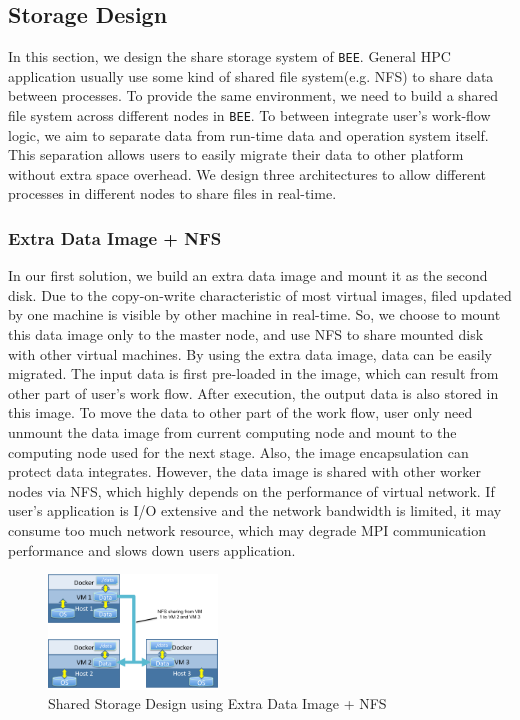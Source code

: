 \subsection{Storage Design}
In this section, we design the share storage system of \texttt{BEE}. General HPC application usually use some kind of shared file system(e.g. NFS) to share data between processes. To provide the same environment, we need to build a shared file system across different nodes in \texttt{BEE}. To between integrate user's work-flow logic, we aim to separate data from run-time data and operation system itself. This separation allows users to easily migrate their data to other platform without extra space overhead. We design three architectures to allow different processes in different nodes to share files in real-time.

\subsubsection{Extra Data Image + NFS}
In our first solution, we build an extra data image and mount it as the second disk. Due to the copy-on-write characteristic of most virtual images, filed updated by one machine is visible by other machine in real-time. So, we choose to mount this data image only to the master node, and use NFS to share mounted disk with other virtual machines. By using the extra data image, data can be easily migrated. The input data is first pre-loaded in the image, which can result from other part of user's work flow. After execution, the output data is also stored in this image. To move the data to other part of the work flow, user only need unmount the data image from current computing node and mount to the computing node used for the next stage. Also, the image encapsulation can protect data integrates. However, the data image is shared with other worker nodes via NFS, which highly depends on the performance of virtual network. If user's application is I/O extensive and the network bandwidth is limited, it may consume too much network resource, which may degrade MPI communication performance and slows down users application.
\begin{figure}[h]
    \centering
    \caption{Shared Storage Design using Extra Data Image + NFS}
    \label{fs1}
    \includegraphics[width=0.4\textwidth]{figures/fs1.pdf}
\end{figure}
